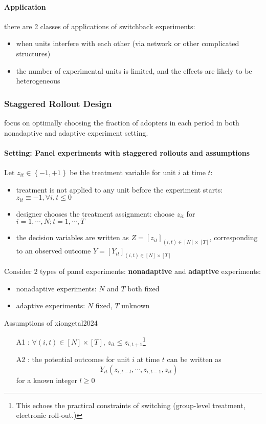 \documentclass[twoside]{article}
\begin{document}
\paragraph{Application} there are 2 classes of applications of switchback experiments:
\begin{itemize}
    \item when units interfere with each other (via network or other complicated structures)
    \item the number of experimental units is limited, and the effects are likely to be heterogeneous
\end{itemize}

\subsubsection{Staggered Rollout Design}

\citet{xiong2024optimal} focus on optimally choosing the fraction of adopters in each period in both nonadaptive and adaptive experiment setting.

\paragraph*{Setting: Panel experiments with staggered rollouts and assumptions} 
Let $z_{it}\in \left\{-1,+1\right\}$ be the treatment variable for unit $i$ at time $t$:
\begin{itemize}
    \item treatment is not applied to any unit before the experiment starts: $z_{it}\equiv -1,\forall i,t\leq 0$
    \item designer chooses the treatment assignment: choose $z_{it}$ for $i=1,\cdots,N;t=1,\cdots,T$
    \item the decision variables are written as $Z=[z_{it}]_{(i,t)\in[N]\times [T]}$, corresponding to an observed outcome $Y=[Y_{it}]_{(i,t)\in[N]\times[T]}$
\end{itemize}
Consider 2 types of panel experiments: \textbf{nonadaptive} and \textbf{adaptive} experiments:
\begin{itemize}
    \item nonadaptive experiments: $N$ and $T$ both fixed
    \item adaptive experiments: $N$ fixed, $T$ unknown
\end{itemize}

\begin{assumption}{Assumptions of \citet{xiong2024optimal}}{xiongetal2024}
    \begin{itemize}
        \item[A1] : $\forall (i,t)\in[N]\times [T]$, $z_{it}\leq z_{i,t+1}$\footnote{This echoes the practical constraints of switching (group-level treatment, electronic roll-out.)}
        \item[A2] : the potential outcomes for unit $i$ at time $t$ can be written as $$ Y_{it}(z_{i,t-l},\cdots,z_{i,t-1},z_{it}) $$ for a known integer $l\geq 0$
    \end{itemize}
\end{assumption}

\newpage


\end{document}
